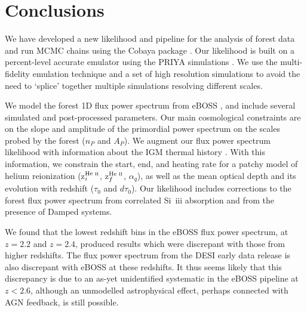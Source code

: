 \section{Conclusions}\label{sec:conclusions}

We have developed a new likelihood and pipeline for the analysis of \Lya forest data and run MCMC chains using the Cobaya package \cite{2021JCAP...05..057T, 2019ascl.soft10019T}.
Our likelihood is built on a percent-level accurate emulator using the PRIYA simulations \cite{2023simsuite}.
We use the multi-fidelity emulation technique \cite{2022MNRAS.517.3200F} and a set of high resolution simulations to avoid the need to `splice' together multiple simulations resolving different scales.

We model the \Lya forest 1D flux power spectrum from eBOSS \cite{2019JCAP...07..017C}, and include several simulated and post-processed parameters.
Our main cosmological constraints are on the slope and amplitude of the primordial power spectrum on the scales probed by the \Lya forest ($n_P$ and $A_P$). 
We augment our \Lya flux power spectrum likelihood with information about the IGM thermal history \cite{2021MNRAS.506.4389G}.
With this information, we constrain the start, end, and heating rate for a patchy model of helium reionization (z$^{\text{He~{\sc ii}}}_i$, z$^{\text{He~{\sc ii}}}_f$, $\alpha_q$), as well as the mean optical depth and its evolution with redshift ($\tau_0$ and $d\tau_0$).
Our likelihood includes corrections to the \lya forest flux power spectrum from correlated Si~{\sc iii} absorption and from the presence of Damped \lya systems.

We found that the lowest redshift bins in the eBOSS flux power spectrum, at $z=2.2$ and $z=2.4$, produced results which were discrepant with those from higher redshifts.
The flux power spectrum from the DESI early data release is also discrepant with eBOSS at these redshifts.
It thus seems likely that this discrepancy is due to an as-yet unidentified systematic in the eBOSS pipeline at $z < 2.6$, although an unmodelled astrophysical effect, perhaps connected with AGN feedback, is still possible.  

